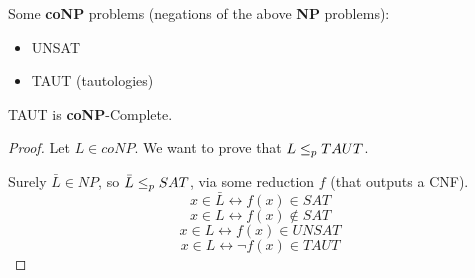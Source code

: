     Some \textbf{coNP} problems (negations of the above \textbf{NP} problems):
    \begin{itemize}
        \item UNSAT
        \item TAUT (tautologies)
    \end{itemize}

    \begin{claim}
        TAUT is \textbf{coNP}-Complete.
    \end{claim}

    \begin{proof}
        Let $L \in coNP$. We want to prove that $L \leq_p TAUT$.

        Surely $\bar{L} \in NP$, so $\bar{L} \leq_p SAT$, via some reduction $f$ (that outputs a CNF).
        \[ x \in \bar{L} \longleftrightarrow f(x) \in SAT \]
        \[ x \in L \longleftrightarrow f(x) \not\in SAT \]
        \[ x \in L \longleftrightarrow f(x) \in UNSAT \]
        \[ x \in L \longleftrightarrow \lnot f(x) \in TAUT \]
    \end{proof}